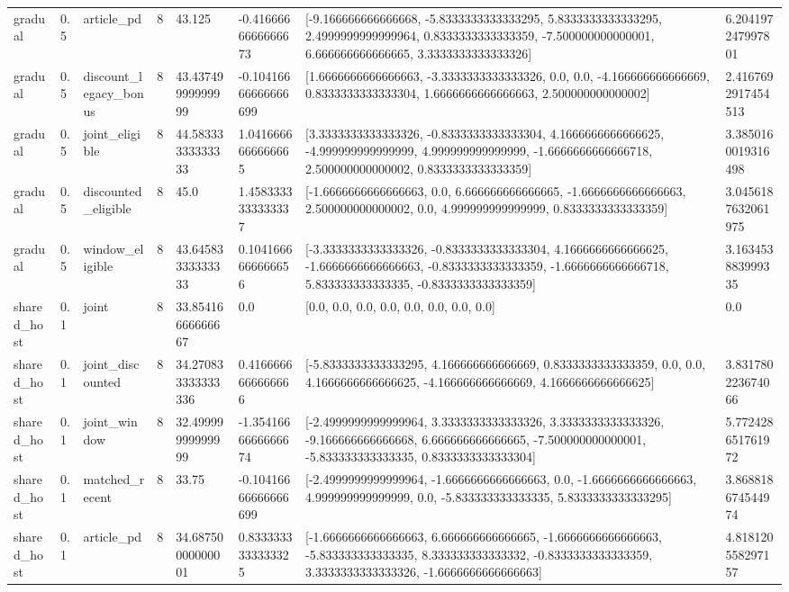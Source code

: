 \begin{tabular}{llllllll}
gradual & 0.5 & article\_pd & 8 & 43.125 & -0.4166666666666673 & [-9.166666666666668, -5.8333333333333295, 5.8333333333333295, 2.4999999999999964, 0.8333333333333359, -7.500000000000001, 6.666666666666665, 3.3333333333333326] & 6.204197247997801 \\
gradual & 0.5 & discount\_legacy\_bonus & 8 & 43.43749999999999 & -0.10416666666666699 & [1.6666666666666663, -3.3333333333333326, 0.0, 0.0, -4.166666666666669, 0.8333333333333304, 1.6666666666666663, 2.500000000000002] & 2.4167692917454513 \\
gradual & 0.5 & joint\_eligible & 8 & 44.58333333333333 & 1.0416666666666665 & [3.3333333333333326, -0.8333333333333304, 4.1666666666666625, -4.999999999999999, 4.999999999999999, -1.6666666666666718, 2.500000000000002, 0.8333333333333359] & 3.3850160019316498 \\
gradual & 0.5 & discounted\_eligible & 8 & 45.0 & 1.4583333333333337 & [-1.6666666666666663, 0.0, 6.666666666666665, -1.6666666666666663, 2.500000000000002, 0.0, 4.999999999999999, 0.8333333333333359] & 3.0456187632061975 \\
gradual & 0.5 & window\_eligible & 8 & 43.64583333333333 & 0.1041666666666656 & [-3.3333333333333326, -0.8333333333333304, 4.1666666666666625, -1.6666666666666663, -0.8333333333333359, -1.6666666666666718, 5.833333333333335, -0.8333333333333359] & 3.163453883999335 \\
shared\_host & 0.1 & joint & 8 & 33.85416666666667 & 0.0 & [0.0, 0.0, 0.0, 0.0, 0.0, 0.0, 0.0, 0.0] & 0.0 \\
shared\_host & 0.1 & joint\_discounted & 8 & 34.270833333333336 & 0.4166666666666666 & [-5.8333333333333295, 4.166666666666669, 0.8333333333333359, 0.0, 0.0, 4.1666666666666625, -4.166666666666669, 4.1666666666666625] & 3.831780223674066 \\
shared\_host & 0.1 & joint\_window & 8 & 32.49999999999999 & -1.3541666666666674 & [-2.4999999999999964, 3.3333333333333326, 3.3333333333333326, -9.166666666666668, 6.666666666666665, -7.500000000000001, -5.833333333333335, 0.8333333333333304] & 5.772428651761972 \\
shared\_host & 0.1 & matched\_recent & 8 & 33.75 & -0.10416666666666699 & [-2.4999999999999964, -1.6666666666666663, 0.0, -1.6666666666666663, 4.999999999999999, 0.0, -5.833333333333335, 5.8333333333333295] & 3.868818674544974 \\
shared\_host & 0.1 & article\_pd & 8 & 34.68750000000001 & 0.8333333333333325 & [-1.6666666666666663, 6.666666666666665, -1.6666666666666663, -5.833333333333335, 8.333333333333332, -0.8333333333333359, 3.3333333333333326, -1.6666666666666663] & 4.818120558297157 \\

\end{tabular}
